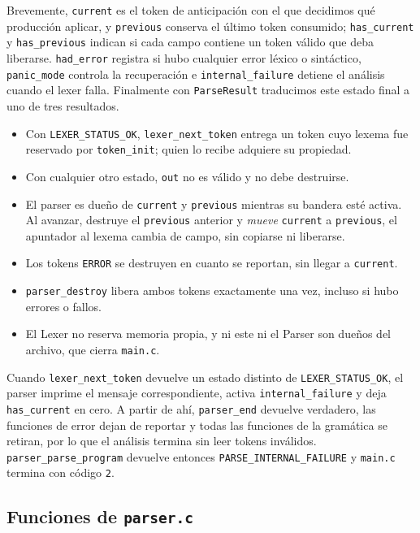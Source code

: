 \documentclass[12pt,letterpaper]{article}
\begin{document}
\bigskip

Brevemente, \texttt{current} es el token de anticipación con el que decidimos qué producción aplicar, y
\texttt{previous} conserva el último token consumido; \texttt{has\_current} y
\texttt{has\_previous} indican si cada campo contiene un token válido que deba liberarse.
\texttt{had\_error} registra si hubo cualquier error léxico o sintáctico, \texttt{panic\_mode} controla la
recuperación e \texttt{internal\_failure} detiene el análisis cuando el lexer falla. Finalmente con
\texttt{ParseResult} traducimos este estado final a uno de tres resultados.

\begin{itemize}
\item Con \texttt{LEXER\_STATUS\_OK}, \texttt{lexer\_next\_token} entrega un token cuyo lexema fue
  reservado por \texttt{token\_init}; quien lo recibe adquiere su propiedad.
\item Con cualquier otro estado, \texttt{out} no es válido y no debe destruirse.
\item El parser es dueño de \texttt{current} y \texttt{previous} mientras su bandera esté activa. Al
  avanzar, destruye el \texttt{previous} anterior y \emph{mueve} \texttt{current} a \texttt{previous}, el
  apuntador al lexema cambia de campo, sin copiarse ni liberarse.
\item Los tokens \texttt{ERROR} se destruyen en cuanto se reportan, sin llegar a \texttt{current}.
\item \texttt{parser\_destroy} libera ambos tokens exactamente una vez, incluso si hubo errores o fallos.
\item El Lexer no reserva memoria propia, y ni este ni el Parser son dueños del archivo, que cierra
  \texttt{main.c}.
\end{itemize}

Cuando \texttt{lexer\_next\_token} devuelve un estado distinto de \texttt{LEXER\_STATUS\_OK}, el parser
imprime el mensaje correspondiente, activa \texttt{internal\_failure} y deja \texttt{has\_current} en cero. A
partir de ahí, \texttt{parser\_end} devuelve verdadero, las funciones de error dejan de reportar y todas las
funciones de la gramática se retiran, por lo que el análisis termina sin leer tokens inválidos.
\texttt{parser\_parse\_program} devuelve entonces \texttt{PARSE\_INTERNAL\_FAILURE} y \texttt{main.c}
termina con código \texttt{2}.

\subsection*{Funciones de \texttt{parser.c}}
\end{document}
